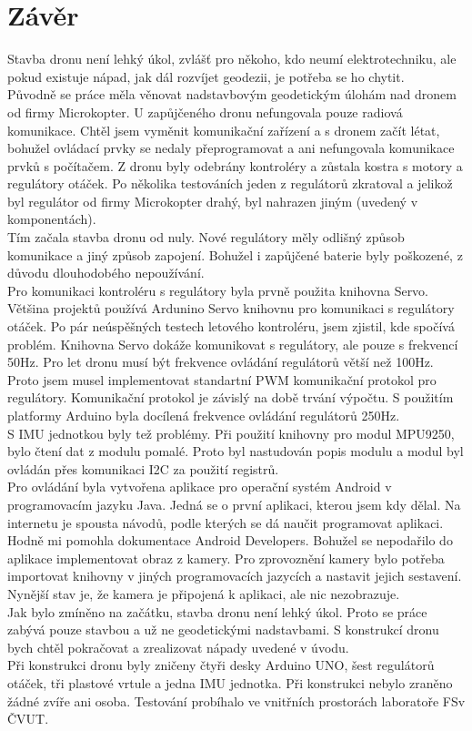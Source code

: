 \chapter{Závěr}
\label{8-zaver}
Stavba dronu není lehký úkol, zvlášť pro někoho, kdo neumí elektrotechniku, ale pokud existuje nápad, jak dál rozvíjet geodezii, je potřeba se ho chytit.\\
Původně se práce měla věnovat nadstavbovým geodetickým úlohám nad dronem od firmy Microkopter. U zapůjčeného dronu nefungovala pouze radiová komunikace. Chtěl jsem vyměnit komunikační zařízení a s dronem začít létat, bohužel ovládací prvky se nedaly přeprogramovat a ani nefungovala komunikace prvků s počítačem. Z dronu byly odebrány kontroléry a zůstala kostra s motory a regulátory otáček. Po několika testováních jeden z regulátorů zkratoval a jelikož byl regulátor od firmy Microkopter drahý, byl nahrazen jiným (uvedený v komponentách).\\
Tím začala stavba dronu od nuly. Nové regulátory měly odlišný způsob komunikace a jiný způsob zapojení. Bohužel i zapůjčené baterie byly poškozené, z důvodu dlouhodobého nepoužívání.\\
Pro komunikaci kontroléru s regulátory byla prvně použita knihovna Servo. Většina projektů používá Ardunino Servo knihovnu pro komunikaci s regulátory otáček. Po pár neúspěšných testech letového kontroléru, jsem zjistil, kde spočívá problém. Knihovna Servo dokáže komunikovat s regulátory, ale pouze s frekvencí 50Hz. Pro let dronu musí být frekvence ovládání regulátorů větší než 100Hz. Proto jsem musel implementovat standartní PWM komunikační protokol pro regulátory. Komunikační protokol je závislý na době trvání výpočtu. S použitím platformy Arduino byla docílená frekvence ovládání regulátorů 250Hz.\\
S IMU jednotkou byly tež problémy. Při použití knihovny pro modul MPU9250, bylo čtení dat z modulu pomalé. Proto byl nastudován popis modulu a modul byl ovládán přes komunikaci I2C za použití registrů.\\
Pro ovládání byla vytvořena aplikace pro operační systém Android v programovacím jazyku Java. Jedná se o první aplikaci, kterou jsem kdy dělal. Na internetu je spousta návodů, podle kterých se dá naučit programovat aplikaci. Hodně mi pomohla dokumentace Android Developers. Bohužel se nepodařilo do aplikace implementovat obraz z kamery. Pro zprovoznění kamery bylo potřeba importovat knihovny v jiných programovacích jazycích a nastavit jejich sestavení. Nynější stav je, že kamera je připojená k aplikaci, ale nic nezobrazuje.\\
Jak bylo zmíněno na začátku, stavba dronu není lehký úkol. Proto se práce zabývá pouze stavbou a už ne geodetickými nadstavbami. S konstrukcí dronu bych chtěl pokračovat a zrealizovat nápady uvedené v úvodu.\\
Při konstrukci dronu byly zničeny čtyři desky Arduino UNO, šest regulátorů otáček, tři plastové vrtule a jedna IMU jednotka. Při konstrukci nebylo zraněno žádné zvíře ani osoba. Testování probíhalo ve vnitřních prostorách laboratoře FSv ČVUT.\\
